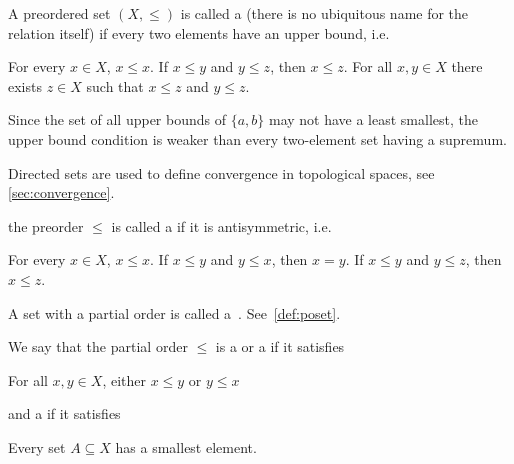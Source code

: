 \begin{definition}
\begin{defenum}
    \item\label{def:order/directed}\cite[8]{Engelking1989} A preordered set $(X, \leq)$ is called a  (there is no ubiquitous name for the relation itself) if every two elements have an upper bound, i.e.
    \begin{description}
       For every $x \in X$, $x \leq x$.
       If $x \leq y$ and $y \leq z$, then $x \leq z$.
       For all $x, y \in X$ there exists $z \in X$ such that $x \leq z$ and $y \leq z$.
    \end{description}

    Since the set of all upper bounds of $\{ a, b \}$ may not have a least smallest, the upper bound condition is weaker than every two-element set having a supremum.

    Directed sets are used to define convergence in topological spaces, see \cref{sec:convergence}.

    \item\label{def:order/partial}\cite[7]{Engelking1989} the preorder $\leq$ is called a  if it is antisymmetric, i.e.
    \begin{description}
       For every $x \in X$, $x \leq x$.
       If $x \leq y$ and $y \leq x$, then $x = y$.
       If $x \leq y$ and $y \leq z$, then $x \leq z$.
    \end{description}

    A set with a partial order is called a~. See~\cref{def:poset}.

    We say that the partial order $\leq$ is a  or a  if it satisfies
    \begin{description}
       For all $x, y \in X$, either $x \leq y$ or $y \leq x$
    \end{description}
    and a  if it satisfies
    \begin{description}
       Every set $A \subseteq X$ has a smallest element.
    \end{description}


\end{defenum}
\end{definition}
